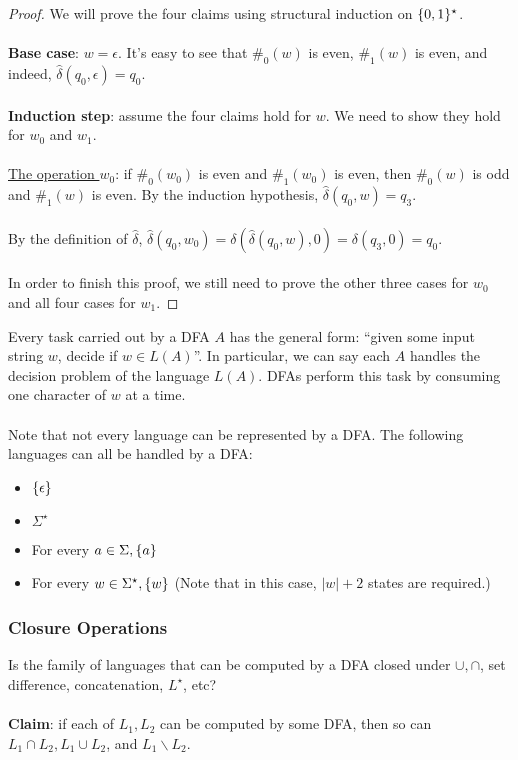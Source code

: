 \documentclass[]{article}
\DeclarePairedDelimiter{\set}{\lbrace}{\rbrace}
\theoremstyle{definition}
\begin{document}
      \begin{proof}
        We will prove the four claims using structural induction on $\set{0, 1}^\star$.
        \\ \\
        \textbf{Base case}: $w = \epsilon$. It's easy to see that $\#_0(w)$ is even, $\#_1(w)$ is even, and indeed, $\hat{\delta}(q_0, \epsilon) = q_0$.
        \\ \\
        \textbf{Induction step}: assume the four claims hold for $w$. We need to show they hold for $w_0$ and $w_1$.
        \\ \\
        \underline{The operation $w_0$}: if $\#_0(w_0)$ is even and $\#_1(w_0)$ is even, then $\#_0(w)$ is odd and $\#_1(w)$ is even. By the induction hypothesis, $\hat{\delta}({q_0, w}) = q_3$.
        \\ \\
        By the definition of $\hat{\delta}$, $\hat{\delta}(q_0, w_0) = \delta( \hat{\delta}(q_0, w), 0) = \delta(q_3, 0) = q_0$.
        \\ \\
        In order to finish this proof, we still need to prove the other three cases for $w_0$ and all four cases for $w_1$.
      \end{proof}

      Every task carried out by a DFA $A$ has the general form: ``given some input string $w$, decide if $w \in L(A)$''. In particular, we can say each $A$ handles the decision problem of the language $L(A)$. DFAs perform this task by consuming one character of $w$ at a time.
      \\ \\
      Note that not every language can be represented by a DFA. The following languages can all be handled by a DFA:
      \begin{itemize}
        \item $\set{ \epsilon }$
        \item $\Sigma^\star$
        \item For every $a \in \Sigma, \set{a}$
        \item For every $w \in \Sigma^\star, \set{w}$ (Note that in this case, $|w| + 2$ states are required.)
      \end{itemize}

      \subsubsection{Closure Operations}
        Is the family of languages that can be computed by a DFA closed under $\cup, \cap$, set difference, concatenation, $L^\star$, etc?
        \\ \\
        \textbf{Claim}: if each of $L_1, L_2$ can be computed by some DFA, then so can $L_1 \cap L_2, L_1 \cup L_2$, and $L_1 \backslash L_2$.
\end{document}
